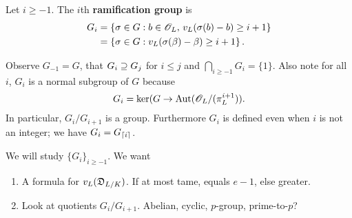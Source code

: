 \begin{df}
Let $i\ge -1$. The $i$th \textbf{ramification group} is
\begin{align*}
G_i&=\left\{{\sigma\in G}:{b\in \mathscr{O}_L,\,v_L(\sigma(b)-b)\ge i+1}\right\}\\
&=\left\{{\sigma\in G}:{v_L(\sigma(\beta)-\beta)\ge i+1}\right\}.
\end{align*}
\end{df}
Observe $G_{-1}=G$, that $G_i\supseteq G_j$ for $i\le j$ and $\bigcap_{i\ge -1}G_i=\{1\}$. Also note for all $i$, $G_i$ is a normal subgroup of $G$ because
\[
G_i=\ker(G\rightarrow \operatorname{Aut}(\mathscr{O}_L/(\pi_L^{i+1})).
\]
In particular, $G_i/G_{i+1}$ is a group. Furthermore $G_i$ is defined even when $i$ is not an integer; we have $G_i=G_{\left\lceil {i}\right\rceil}$. 

We will study $\{G_i\}_{i\ge -1}$. We want
\begin{enumerate}
\item
A formula for $v_L(\mathfrak D_{L/K})$. If at most tame, equals $e-1$, else greater.
\item
Look at quotients $G_i/G_{i+1}$. Abelian, cyclic, $p$-group, prime-to-$p$?
\end{enumerate}
